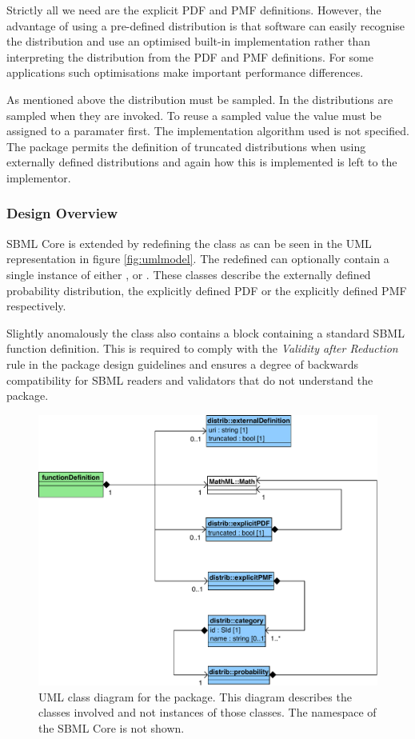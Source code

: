 \documentclass[draftspec]{sbmlpkgspec}
\begin{document}
Strictly all we need are the explicit PDF and PMF
definitions. However, the advantage of using a pre-defined
distribution is that software can easily recognise the distribution
and use an optimised built-in implementation rather than interpreting
the distribution from the PDF and PMF definitions. For some
applications such optimisations make important performance
differences.

As mentioned above the distribution must be sampled. In \distribshort
the distributions are sampled when they are invoked. To reuse a
sampled value the value must be assigned to a paramater first. The
implementation algorithm used is not specified. The package permits
the definition of truncated distributions when using externally
defined distributions and again how this is implemented is left to the
implementor.

\subsubsection{Design Overview}

SBML Core is extended by redefining the \FunctionDefinition class as
can be seen in the UML representation in figure
\vref{fig:umlmodel}. The redefined \FunctionDefinition can optionally
contain a single instance of either ,
 or . These classes describe the
externally defined probability distribution, the explicitly defined
PDF or the explicitly defined PMF respectively.

Slightly anomalously the \FunctionDefinition class also contains a
\mathml block containing a standard SBML function definition. This is
required to comply with the \emph{Validity after Reduction} rule in the
package design guidelines \cite{sbmll3v1packrule} and ensures a degree
of backwards compatibility for SBML readers and validators that do not
understand the \distribshort package.

\begin{figure}[htb]
\includegraphics[width=0.75\linewidth]{DistribUMLModel.pdf}
\caption{UML class diagram for the \distrib package. This diagram
  describes the classes involved and not instances of those
  classes. The namespace of the SBML Core is not shown.}
\label{fig:umlmodel}
\end{figure}
\end{document}
